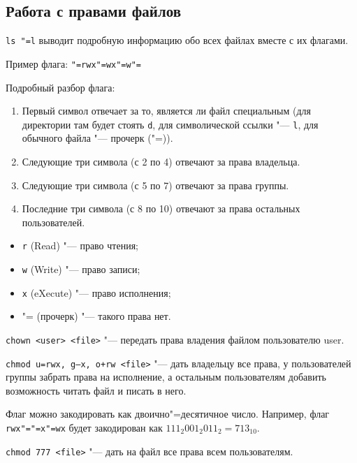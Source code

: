 \subsection{Работа с правами файлов}

\texttt{ls "=l} выводит подробную информацию обо всех файлах вместе с их флагами.

Пример флага: \texttt{"=rwx"=wx"=w"=}

Подробный разбор флага:
\begin{enumerate}
    \item Первый символ отвечает за то, является ли файл специальным (для директории там будет стоять \texttt{d}, для символической ссылки "--- \texttt{l}, для обычного файла "--- прочерк ("=)).
	\item Следующие три символа (с 2 по 4) отвечают за права владельца.
	\item Следующие три символа (с 5 по 7) отвечают за права группы.
	\item Последние три символа (с 8 по 10) отвечают за права остальных пользователей.
\end{enumerate}

\begin{itemize}
    \item \texttt{r} (Read) "--- право чтения;
    \item \texttt{w} (Write) "--- право записи;
    \item \texttt{x} (eXecute) "--- право исполнения;
	\item "= (прочерк) "--- такого права нет.
\end{itemize}

\texttt{chown <user> <file>} "--- передать права владения файлом пользователю user.

\texttt{chmod u=rwx, g--x, o+rw <file>} "--- дать владельцу все права, у пользователей группы забрать права на исполнение, а остальным пользователям добавить возможность читать файл и писать в него.

Флаг можно закодировать как двоично"=десятичное число. Например, флаг \texttt{rwx"="=x"=wx} будет закодирован как $111_2 001_2 011_2 = 713_{10}$.

\texttt{chmod 777 <file>} "--- дать на файл все права всем пользователям.
